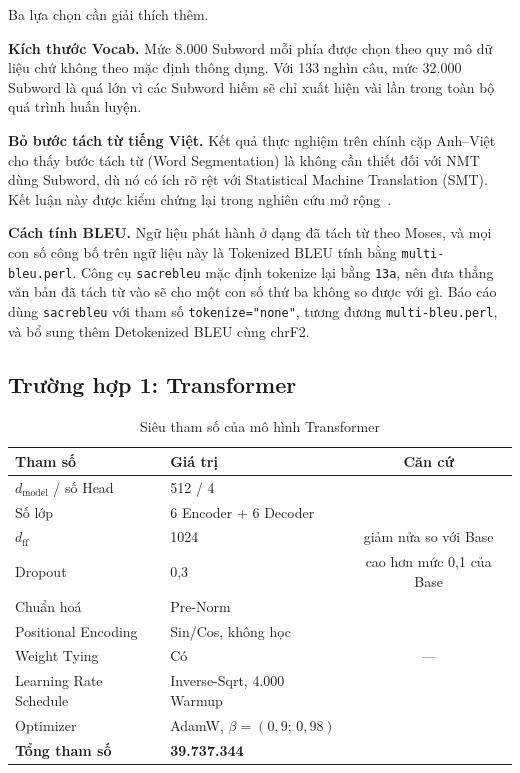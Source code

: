 \documentclass[11pt,a4paper]{article}
\newcommand{\file}[1]{\texttt{\small #1}}
\begin{document}
Ba lựa chọn cần giải thích thêm.

\textbf{Kích thước Vocab.} Mức 8.000 Subword mỗi phía được chọn theo quy mô dữ
liệu chứ không theo mặc định thông dụng. Với 133 nghìn câu, mức 32.000 Subword
là quá lớn vì các Subword hiếm sẽ chỉ xuất hiện vài lần trong toàn bộ quá trình
huấn luyện.

\textbf{Bỏ bước tách từ tiếng Việt.} Kết quả thực nghiệm trên chính cặp
Anh--Việt~\cite{phanvu2017} cho thấy bước tách từ (Word Segmentation) là không
cần thiết đối với NMT dùng Subword, dù nó có ích rõ rệt với Statistical Machine
Translation (SMT). Kết luận này được kiểm chứng lại trong nghiên cứu mở
rộng~\cite{phanvu2019}.

\textbf{Cách tính BLEU.} Ngữ liệu phát hành ở dạng đã tách từ theo Moses, và mọi
con số công bố trên ngữ liệu này là Tokenized BLEU tính bằng \file{multi-bleu.perl}.
Công cụ \file{sacrebleu} mặc định tokenize lại bằng \file{13a}, nên đưa thẳng
văn bản đã tách từ vào sẽ cho một con số thứ ba không so được với gì. Báo cáo
dùng \file{sacrebleu} với tham số \file{tokenize="none"}, tương đương
\file{multi-bleu.perl}, và bổ sung thêm Detokenized BLEU cùng chrF2.

\subsection{Trường hợp 1: Transformer}

\begin{table}[H]
\centering
\small
\caption{Siêu tham số của mô hình Transformer}
\label{tab:cfg-tf}
\begin{tabular}{llc}
\toprule
\textbf{Tham số} & \textbf{Giá trị} & \textbf{Căn cứ} \\
\midrule
$d_{\text{model}}$ / số Head       & 512 / 4                    & \cite{vaswani2017} \\
Số lớp                             & 6 Encoder + 6 Decoder      & \cite{vaswani2017} \\
$d_{\text{ff}}$                    & 1024                       & giảm nửa so với Base \\
Dropout                            & 0,3                        & cao hơn mức 0,1 của Base \\
Chuẩn hoá                          & Pre-Norm                   & \cite{nguyen2019} \\
Positional Encoding                & Sin/Cos, không học         & \cite{vaswani2017} \\
Weight Tying                       & Có                         & --- \\
Learning Rate Schedule             & Inverse-Sqrt, 4.000 Warmup & \cite{vaswani2017} \\
Optimizer                          & AdamW, $\beta=(0{,}9;\,0{,}98)$ & \cite{vaswani2017} \\
\midrule
\textbf{Tổng tham số}              & \textbf{39.737.344}        & \\
\bottomrule
\end{tabular}
\end{table}
\end{document}
